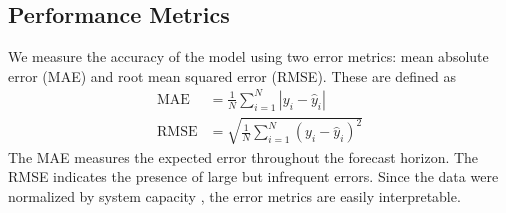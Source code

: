 \subsection{Performance Metrics}
We measure the accuracy of the model using two error metrics:
mean absolute error (MAE) and root mean squared error (RMSE).
These are defined as
\begin{align}
  \text{MAE} &= \frac{1}{N}\sum_{i=1}^N\left|y_i - \hat{y}_i\right|\\
  \text{RMSE} &= \sqrt{\frac{1}{N}\sum_{i=1}^N\left(y_i - \hat{y}_i\right)^2}
\end{align}
The MAE measures the expected error throughout the forecast horizon. The RMSE
indicates the presence of large but infrequent errors. Since the data were
normalized by system capacity \cite{wang_quantifying_2016}, the error metrics
are easily interpretable.
